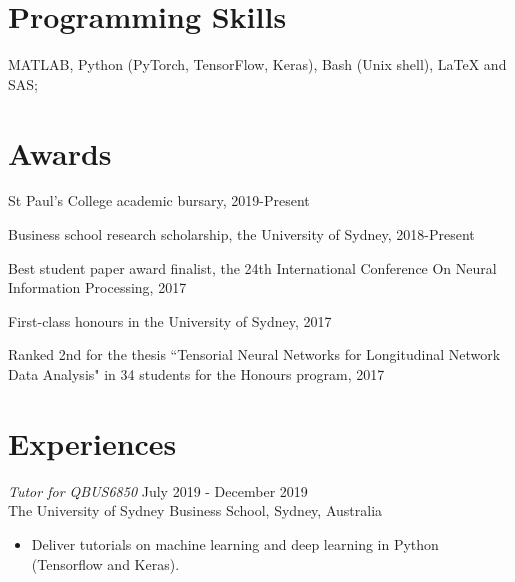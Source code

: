 \documentclass[margin, 11pt]{res} %
\begin{document}
\begin{resume}
\section{Programming Skills} 

MATLAB, Python (PyTorch, TensorFlow, Keras), Bash (Unix shell), LaTeX and SAS; \\

 
\section{Awards}
St Paul's College academic bursary, 2019-Present

Business school research scholarship, the University of Sydney, 2018-Present

Best student paper award finalist, the 24th International Conference On Neural Information Processing, 2017

First-class honours in the University of Sydney, 2017

Ranked 2nd for the thesis ``Tensorial Neural Networks for
Longitudinal Network Data Analysis" in 34 students for the Honours program, 2017

\section{Experiences}
{\sl Tutor for QBUS6850} \hfill July 2019 - December 2019 \\
{The University of Sydney Business School, Sydney, Australia}
\begin{itemize}
\item Deliver tutorials on machine learning and deep learning in Python (Tensorflow and Keras).
\end{itemize}


\end{resume}
\end{document}
